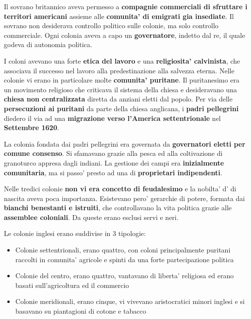 \documentclass{article}
\begin{document}
{{    Il sovrano britannico aveva permesso a \textbf{compagnie commerciali di sfruttare i territori americani} assieme alle \textbf{comunita' di emigrati gia insediate}. Il sovrano non desiderava controllo politico sulle colonie, ma solo controllo commerciale. Ogni colonia aveva a capo un \textbf{governatore}, indetto dal re, il quale godeva di autonomia politica.

    I coloni avevano una forte \textbf{etica del lavoro} e una \textbf{religiosita' calvinista}, che associava il successo nel lavoro alla predestinazione alla salvezza eterna. Nelle colonie vi erano in particolare molte \textbf{comunita' puritane}. Il puritanesimo era un movimento religioso che criticava il sistema della chiesa e desideravano una \textbf{chiesa non centralizzata} diretta da anziani eletti dal popolo. Per via delle \textbf{persecuzioni ai puritani} da parte della chiesa anglicana, i \textbf{padri pellegrini} diedero il via ad una \textbf{migrazione verso l'America settentrionale} nel \textbf{Settembre 1620}.

    La colonia fondata dai padri pellegrini era governata da \textbf{governatori eletti per comune consenso}. Si sfamavano grazie alla pesca ed alla coltivazione di granoturco appresa dagli indiani. La gestione dei campi era \textbf{inizialmente comunitaria}, ma si passo' presto ad una di \textbf{proprietari indipendenti}.

    Nelle tredici colonie \textbf{non vi era concetto di feudalesimo} e la nobilta' d' di nascita aveva poca importanza. Esistevano pero' gerarchie di potere, formata dai \textbf{bianchi benestanti e istruiti}, che controllavano la vita politica grazie alle \textbf{assemblee coloniali}. Da queste erano esclusi servi e neri.

    Le colonie inglesi erano suddivise in 3 tipologie:

    \begin{itemize}
      \item Colonie settentrionali, erano quattro, con coloni principalmente puritani raccolti in comunita' agricole e spinti da una forte partecipazione politica
      \item Colonie del centro, erano quattro, vantavano di liberta' religiosa ed erano basati sull'agricoltura ed il commercio
      \item Colonie meridionali, erano cinque, vi vivevano aristocratici minori inglesi e si basavano su piantagioni di cotone e tabacco
    \end{itemize}

}}
\end{document}
